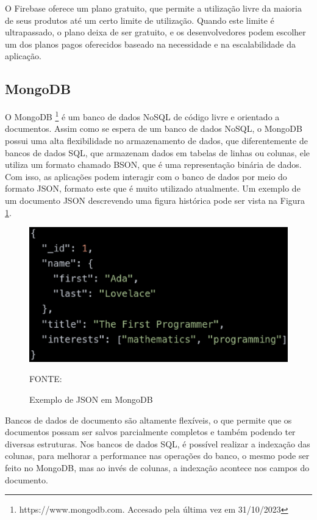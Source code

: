 O Firebase oferece um plano gratuito, que permite a utilização livre da maioria de seus produtos até um certo limite de utilização. 
Quando este limite é ultrapassado, o plano deixa de ser gratuito, e os desenvolvedores podem escolher um dos planos pagos oferecidos 
baseado na necessidade e na escalabilidade da aplicação.

\subsection{MongoDB}

O MongoDB \footnote{https://www.mongodb.com. Accesado pela última vez em 31/10/2023} é um banco de dados NoSQL de código livre e orientado a documentos. 
Assim como se espera de um banco de dados NoSQL, 
o MongoDB possui uma alta flexibilidade no armazenamento de dados, que diferentemente de bancos de dados SQL, que armazenam dados 
em tabelas de linhas ou colunas, ele utiliza um formato chamado BSON, que é uma representação binária de dados. Com isso, as aplicações 
podem interagir com o banco de dados por meio do formato JSON, formato este que é muito utilizado atualmente. Um exemplo de um documento 
JSON descrevendo uma figura histórica pode ser vista na Figura \ref{fig-mongodb-json}.

\begin{figure}[h]
	\centering
	\caption{Exemplo de JSON em MongoDB}
	\includegraphics[keepaspectratio=true,scale=0.4]{figuras/mongodb-json.eps}
    \parbox{\linewidth}{\centering FONTE: \cite{MongoDB}}
	\label{fig-mongodb-json}
\end{figure}

Bancos de dados de documento são altamente flexíveis, o que permite que os documentos possam ser salvos parcialmente 
completos e também podendo ter diversas estruturas. Nos bancos de dados SQL, é possível realizar a indexação das colunas, 
para melhorar a performance nas operações do banco, o mesmo pode ser feito no MongoDB, mas ao invés de colunas, a indexação 
acontece nos campos do documento.

